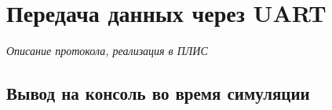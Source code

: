 \chapter{Передача данных через UART}

\emph{Описание протокола, реализация в ПЛИС}

\section{Вывод на консоль во время симуляции}
